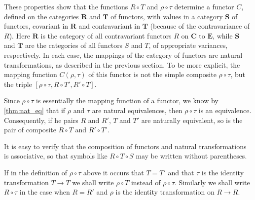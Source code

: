 \documentclass[11pt,a4paper]{report}
\begin{document}
These properties show that the functions $R\circ T$ and $\rho\circ\tau$ determine a functor
$C$, defined on the categories $\mathbf{R}$ and $\mathbf{T}$ of functors, with values in
a category $\mathbf{S}$ of functors, covariant in $\mathbf{R}$ and contravariant in $\mathbf{T}$
(because of the contravariance of $R$). Here $\mathbf{R}$ is the category of all contravariant
functors $R$ on $\mathbf{C}$ to $\mathbf{E}$, while $\mathbf{S}$ and $\mathbf{T}$ are the
categories of all functors $S$ and $T$, of appropriate variances, respectively. In each case, the
mappings of the category of functors are natural transformations, as described in the previous
section. To be more explicit, the mapping function $C(\rho,\tau)$ of this functor is not the 
simple composite $\rho\circ\tau$, but the triple $[\rho\circ\tau, R\circ T', R'\circ T]$.

Since $\rho\circ\tau$ is essentially the mapping function of a functor, we know by \autoref{thm:nat_eq}
that if $\rho$ and $\tau$ are natural equivalences, then $\rho\circ\tau$ is an equivalence. Consequently,
if he pairs $R$ and $R'$, $T$ and $T'$ are naturally equivalent, so is the pair of composite $R\circ T$
and $R'\circ T'$.

It is easy to verify that the composition of functors and natural transformations is associative, so that
symbols like $R\circ T\circ S$ may be written without parentheses.

If in the definition of $\rho\circ\tau$ above it occurs that $T=T'$ and that $\tau$ is the identity
transformation $T\rightarrow T$ we shall write $\rho\circ T$ instead of $\rho\circ\tau$. Similarly
we shall write $R\circ\tau$ in the case when $R=R'$ and $\rho$ is the identity transformation on
$R\rightarrow R$.
\end{document}

